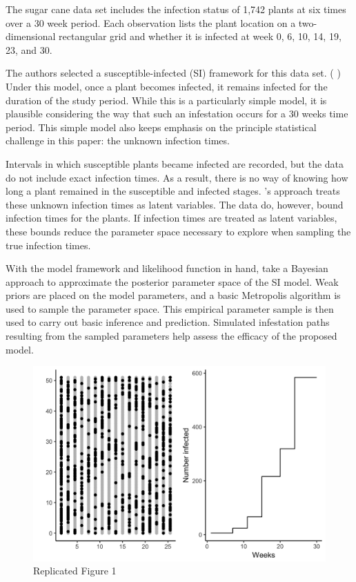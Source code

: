 \documentclass{uwstat572}
\newcommand{\vmcomment}[1]{({\color{blue}{VM's comment:}} \textbf{\color{blue}{#1}})}
\begin{document}
The sugar cane data set includes the infection status of 1,742 plants at six times over a 30 week period. 
Each observation lists the plant location on a two-dimensional rectangular grid and whether it is infected at week 0, 6, 10, 14, 19, 23, and 30.

The authors selected a susceptible-infected (SI) framework for this data set.
\vmcomment{I don't like ``framework for this data set'' phrase} 
Under this model, once a plant becomes infected, it remains infected for the duration of the study period. 
While this is a particularly simple model, it is plausible considering the way that such an infestation occurs for a 30 weeks time period. 
This simple model also keeps emphasis on the principle statistical challenge in this paper: the unknown infection times. 

Intervals in which susceptible plants became infected are recorded, but the data do not include exact infection times.  
As a result, there is no way of knowing how long a plant remained in the susceptible and infected stages.
\cite{Brown}'s approach treats these unknown infection times as latent variables.
The data do, however, bound infection times for the plants.
If infection times are treated as latent variables, these bounds reduce the parameter space necessary to explore when sampling the true infection times. 

With the model framework and likelihood function in hand, \cite{Brown} take a Bayesian approach to approximate the posterior parameter space of the SI model. 
Weak priors are placed on the model parameters, and a basic Metropolis algorithm is used to sample the parameter space. 
This empirical parameter sample is then used to carry out basic inference and prediction. 
Simulated infestation paths resulting from the sampled parameters help assess the efficacy of the proposed model. 

\begin{figure}[H]
\centering
\includegraphics[height=0.45\linewidth, keepaspectratio]{figures/figure_1.png}
\caption{Replicated Figure 1}
   \label{fig:data_plot}
\end{figure}
\end{document}
